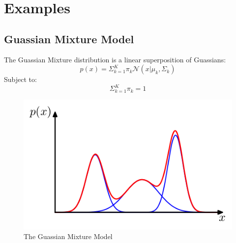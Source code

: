 \documentclass[11pt]{article}
\begin{document}
\section{Examples}
\subsection{Guassian Mixture Model}
The Guassian Mixture distribution is a linear superposition of Guassians: 
\begin{equation}
p(x) = \Sigma^K_{k=1}\pi_k\mathcal{N}(x|\mu_k,\Sigma_k)
\end{equation}
Subject to:
\begin{equation}
\Sigma^K_{k=1}\pi_k = 1
\end{equation}
\begin{figure}[htp]
\centering
\includegraphics[scale=0.50]{GMM-example2.png}
\caption{The Guassian Mixture Model}
\end{figure}
\end{document}
